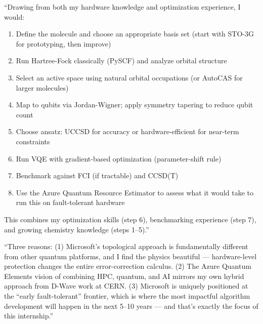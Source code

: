 \documentclass[11pt,a4paper]{article}
\begin{document}
\begin{answerbox}
``Drawing from both my hardware knowledge and optimization experience, I would:
\begin{enumerate}
    \item Define the molecule and choose an appropriate basis set (start with STO-3G for prototyping, then improve)
    \item Run Hartree-Fock classically (PySCF) and analyze orbital structure
    \item Select an active space using natural orbital occupations (or AutoCAS for larger molecules)
    \item Map to qubits via Jordan-Wigner; apply symmetry tapering to reduce qubit count
    \item Choose ansatz: UCCSD for accuracy or hardware-efficient for near-term constraints
    \item Run VQE with gradient-based optimization (parameter-shift rule)
    \item Benchmark against FCI (if tractable) and CCSD(T)
    \item Use the Azure Quantum Resource Estimator to assess what it would take to run this on fault-tolerant hardware
\end{enumerate}
This combines my optimization skills (step 6), benchmarking experience (step 7), and growing chemistry knowledge (steps 1--5).''
\end{answerbox}

\begin{answerbox}
``Three reasons: (1) Microsoft's topological approach is fundamentally different from other quantum platforms, and I find the physics beautiful --- hardware-level protection changes the entire error-correction calculus. (2) The Azure Quantum Elements vision of combining HPC, quantum, and AI mirrors my own hybrid approach from D-Wave work at CERN. (3) Microsoft is uniquely positioned at the ``early fault-tolerant'' frontier, which is where the most impactful algorithm development will happen in the next 5--10 years --- and that's exactly the focus of this internship.''
\end{answerbox}
\end{document}
